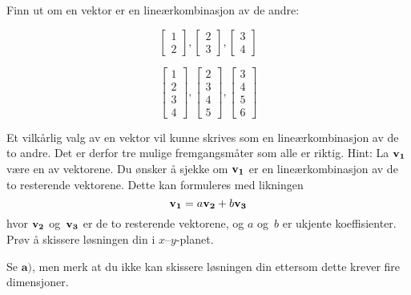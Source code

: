 \begin{oppgave}
Finn ut om en vektor er en lineærkombinasjon av de andre:
\begin{punkt}
$$
\begin{bmatrix}
1\\
2
\end{bmatrix},
\begin{bmatrix}
2\\
3
\end{bmatrix},
\begin{bmatrix}
3\\
4
\end{bmatrix}
$$
\end{punkt}
\begin{punkt}
	$$
	\begin{bmatrix}
	1\\
	2\\
	3\\
	4
	\end{bmatrix},
	\begin{bmatrix}
	2\\
	3\\
	4\\
	5
	\end{bmatrix},
	\begin{bmatrix}
	3\\
	4\\
	5\\
	6
	\end{bmatrix}
	$$
\end{punkt}
\end{oppgave}
\begin{losning}
\begin{punkt}
Et vilkårlig valg av en vektor vil kunne skrives som en lineærkombinasjon av de to andre. Det er derfor tre mulige fremgangsmåter som alle er riktig.
Hint: La $\mathbf{v_1}$ være en av vektorene. Du ønsker å sjekke om $\mathbf{v_1}$ er en lineærkombinasjon av de to resterende vektorene. Dette kan formuleres med likningen $$\mathbf{v_1}=a\mathbf{v_2}+b\mathbf{v_3}$$ hvor $\mathbf{v_2}$ og~$\mathbf{v_3}$ er de to resterende vektorene, og $a$ og~$b$ er ukjente koeffisienter. Prøv å skissere løsningen din i $x$--$y$-planet.
\end{punkt}
\begin{punkt}
Se $\textbf{a)}$, men merk at du ikke kan skissere løsningen din ettersom dette krever fire dimensjoner. 
\end{punkt}
\end{losning}

